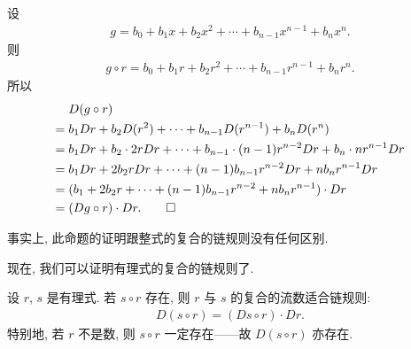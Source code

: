 \begin{pf}
    设
    \begin{align*}
        g = b_0 + b_1 x + b_2 x^2 + \cdots + b_{n-1} x^{n-1} + b_n x^n.
    \end{align*}
    则
    \begin{align*}
        g \circ r = b_0 + b_1 r + b_2 r^2 + \cdots + b_{n-1} r^{n-1} + b_n r^n.
    \end{align*}
    所以
    \begin{align*}
             & D(g \circ r)                                                                             \\
        = {} & b_1 Dr + b_2 D(r^2) + \cdots + b_{n-1} D(r^{n-1}) + b_n D(r^n)                           \\
        = {} & b_1 Dr + b_2 \cdot 2rDr + \cdots + b_{n-1} \cdot (n-1)r^{n-2} Dr + b_n \cdot nr^{n-1} Dr \\
        = {} & b_1 Dr + 2b_2 r Dr + \cdots + (n-1)b_{n-1} r^{n-2} Dr + nb_n r^{n-1} Dr                  \\
        = {} & (b_1 + 2b_2 r + \cdots + (n-1)b_{n-1} r^{n-2} + nb_n r^{n-1}) \cdot Dr                   \\
        = {} & (Dg \circ r) \cdot Dr. \qedhere
    \end{align*}
\end{pf}

\begin{remark}
    事实上, 此命题的证明跟整式的复合的链规则没有任何区别.
\end{remark}

现在, 我们可以证明有理式的复合的链规则了.

\begin{proposition}
    设 $r$, $s$ 是有理式. 若 $s \circ r$ 存在, 则 $r$ 与 $s$ 的复合的流数适合链规则:
    \begin{align*}
        D(s \circ r) = (Ds \circ r) \cdot Dr.
    \end{align*}
    特别地, 若 $r$ 不是数, 则 $s \circ r$ 一定存在——故 $D(s \circ r)$ 亦存在.
\end{proposition}

